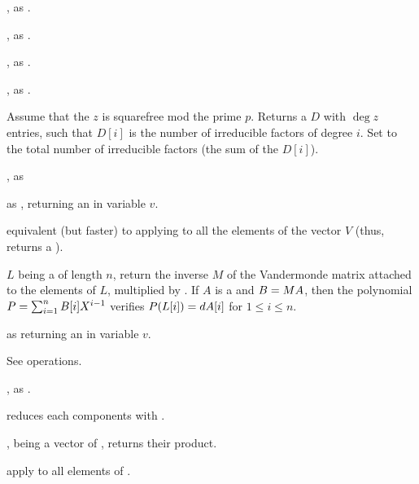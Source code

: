 , as .

, as .

,
as .

, as .

 Assume
that the  $z$ is squarefree mod the prime $p$. Returns a
 $D$ with $\deg z$ entries, such that $D[i]$ is the number of
irreducible factors of degree $i$. Set  to the total number of
irreducible factors (the sum of the $D[i]$).

,\hfil\break
as 

 as ,
returning an  in variable $v$.

 equivalent (but
faster) to applying  to all the elements of the
vector $V$ (thus, returns a ).

 $L$ being a 
of length $n$, return the inverse $M$ of the Vandermonde matrix attached to
the elements of $L$, multiplied by .
If $A$ is a  and $B=M\*A$, then the polynomial
$P=\sum_{i=1}^n B[i]\*X^{i-1}$ verifies $P(L[i])=d\*A[i]$ for
$1 \leq i \leq n$.

 as
 returning an  in variable $v$.

 See  operations.

, as .

 reduces each components with .

,  being a vector of ,
returns their product.

apply  to all elements of .


